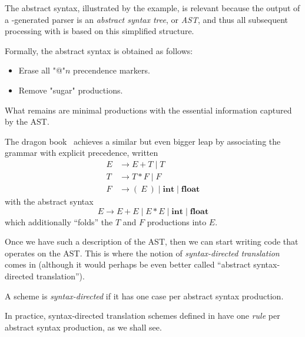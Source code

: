 \documentclass[11pt]{article} %
\begin{document}
The abstract syntax, illustrated by the example, is relevant because the output of a \HAX-generated
parser is an \emph{abstract syntax tree}, or \emph{AST}, and thus all subsequent processing with
\HAX is based on this simplified structure.

Formally, the abstract syntax is obtained as follows:
\begin{itemize}
\item Erase all "@"$n$ precendence markers.
\item Remove "sugar" productions.
\end{itemize}
What remains are minimal productions with the essential information captured by the AST.

{\small\begin{remark}%
    The dragon book~\cite{Aho+:2006} achieves a similar but even bigger leap by associating the
    grammar with explicit precedence, written
    \begin{align*}
      E &→ E+T \mid T \\
      T &→ T*F \mid F \\
      F &→ (~E~) \mid \textbf{int} \mid \textbf{float}
    \end{align*}
    with the abstract syntax
    \begin{displaymath}
      E → E+E \mid E*E \mid \textbf{int} \mid \textbf{float}
    \end{displaymath}
    which additionally ``folds'' the $T$ and $F$ productions into $E$.
  \end{remark}}

Once we have such a description of the AST, then we can start writing code that operates on the
AST. This is where the notion of \emph{syntax-directed translation} comes in (although it would
perhaps be even better called ``abstract syntax-directed translation'').

\begin{definition}
  A scheme is \emph{syntax-directed} if it has one case per abstract syntax production.
\end{definition}

In practice, syntax-directed translation schemes defined in \HAX have one \emph{rule} per abstract
syntax production, as we shall see.
\end{document}
